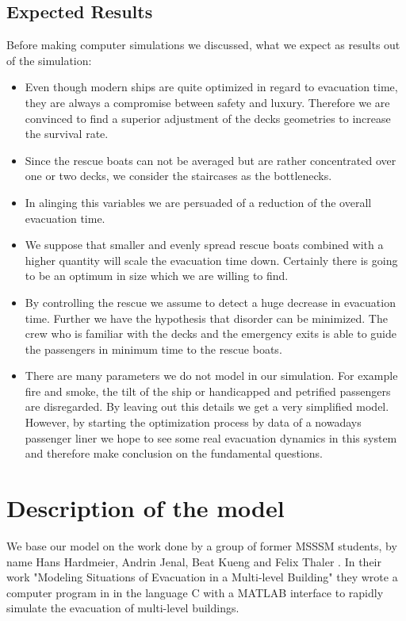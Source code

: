 \documentclass[11pt]{article}
\begin{document}
\subsection{Expected Results}
Before making computer simulations we discussed, what we expect as results out of the simulation:
\begin{itemize}
\item Even though modern ships are quite optimized in regard to evacuation time, they are always a compromise between safety and luxury. Therefore we are convinced to find a superior adjustment of the decks geometries to increase the survival rate.
\item Since the rescue boats can not be averaged but are rather concentrated over one or two decks, we consider the staircases as the bottlenecks.
\item In alinging this variables we are persuaded of a reduction of the overall evacuation time.
\item We suppose that smaller and evenly spread rescue boats combined with a higher quantity will scale the evacuation time down. Certainly there is going to be an optimum in size which we are willing to find.
\item By controlling the rescue we assume to detect a huge decrease in evacuation time. Further we have the hypothesis that disorder can be minimized. The crew who is familiar with the decks and the emergency exits is able to guide the passengers in minimum time to the rescue boats.
\item There are many parameters we do not model in our simulation. For example fire and smoke, the tilt of the ship or handicapped and petrified passengers are disregarded. By leaving out this details we get a very simplified model. However, by starting the optimization process by data of a nowadays passenger liner we hope to see some real evacuation dynamics in this system and therefore make conclusion on the fundamental questions.
\end{itemize}

\newpage

\section{Description of the model}
We base our model on the work done by a group of former MSSSM students, by name Hans Hardmeier, Andrin Jenal, Beat Kueng and Felix Thaler \cite{Building}. In their work "Modeling Situations of Evacuation in a Multi-level Building" they wrote a computer program in in the language C with a MATLAB interface to rapidly simulate the evacuation of multi-level buildings.\bigskip
\end{document}
